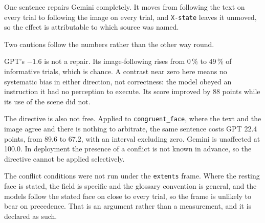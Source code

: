 One sentence repairs Gemini completely. It moves from following the text on
every trial to following the image on every trial, and \texttt{X-state} leaves
it unmoved, so the effect is attributable to which source was named.

Two cautions follow the numbers rather than the other way round.

GPT's $-1.6$ is not a repair. Its image-following rises from 0\,\% to 49\,\% of
informative trials, which is chance. A contrast near zero here means no
systematic bias in either direction, not correctness: the model obeyed an
instruction it had no perception to execute. Its score improved by 88 points
while its use of the scene did not.

The directive is also not free. Applied to \texttt{congruent\_face}, where the
text and the image agree and there is nothing to arbitrate, the same sentence
costs GPT 22.4 points, from 89.6 to 67.2, with an interval excluding zero.
Gemini is unaffected at 100.0. In deployment the presence of a conflict is not
known in advance, so the directive cannot be applied selectively.

The conflict conditions were not run under the \texttt{extents} frame. Where
the resting face is stated, the field is specific and the glossary convention
is general, and the models follow the stated face on close to every trial, so
the frame is unlikely to bear on precedence. That is an argument rather than a
measurement, and it is declared as such.
